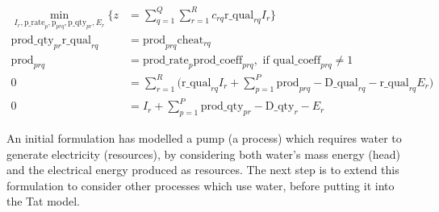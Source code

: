 \begin{align}
	\min_{I_r,\mbox{p\_rate}_p,\mbox{p}_{prq},\mbox{p\_qty}_{pr},E_r} \Bigg\{z&=\sum_{q=1}^Q \sum_{r=1}^R c_{rq}\mbox{r\_qual}_{rq}I_{r}\Bigg\} \label{eq:water_OF} \\
	\mbox{prod\_qty}_{pr} \mbox{r\_qual}_{rq} &= \mbox{prod}_{prq} \mbox{cheat}_{rq} \label{eq:qty_rate} \\ 
	\mbox{prod}_{prq} &= \mbox{prod\_rate}_{p} \mbox{prod\_coeff}_{prq}, \mbox{    if } \mbox{qual\_coeff}_{prq} \neq 1 \label{eq:qual_rate} \\
	0 &= \sum_{r=1}^R \Bigg(\mbox{r\_qual}_{rq} I_r + \sum_{p=1}^P \mbox{prod}_{prq} - \mbox{D\_qual}_{rq} - \mbox{r\_qual}_{rq} E_r \Bigg) \label{eq:qual_balance} \\
	0 &= I_r + \sum_{p=1}^P\mbox{prod\_qty}_{pr} - \mbox{D\_qty}_{r}-E_r \label{eq:qty_balance} 
\end{align}

An initial formulation has modelled a pump (a process) which requires water to generate electricity (resources), by considering both water's mass energy (head) and the electrical energy produced as resources. The next step is to extend this formulation to consider other processes which use water, before putting it into the Tat model.
